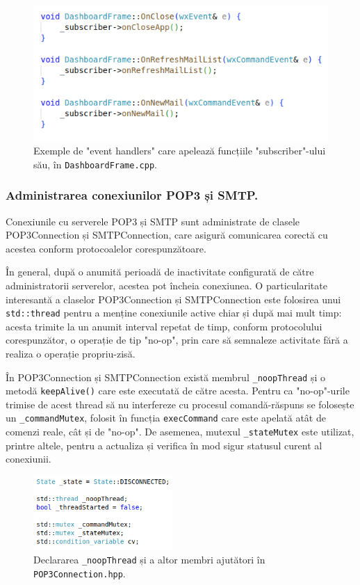 \documentclass[runningheads]{llncs}
\begin{document}
\begin{figure}
    \centering
    \includegraphics[width=\textwidth]{subscriberFxns.png}
    \caption{Exemple de "event handlers" care apelează funcțiile "subscriber"-ului său, în \texttt{DashboardFrame.cpp}.}
    \label{fig:subscriberFxns}
\end{figure}

\subsubsection{Administrarea conexiunilor POP3 și SMTP.}

Conexiunile cu serverele POP3 și SMTP sunt administrate de clasele POP3Connection și SMTPConnection, care asigură comunicarea corectă cu acestea conform protocoalelor corespunzătoare. 

În general, după o anumită perioadă de inactivitate configurată de către administratorii serverelor, acestea pot încheia conexiunea. O particularitate interesantă a claselor POP3Connection și SMTPConnection este folosirea unui \texttt{std::thread} pentru a menține conexiunile active chiar și după mai mult timp: acesta trimite la un anumit interval repetat de timp, conform protocolului corespunzător, o operație de tip "no-op", prin care să semnaleze activitate fără a realiza o operație propriu-zisă.

În POP3Connection și SMTPConnection există membrul \texttt{\_noopThread} și o metodă \texttt{keepAlive()} care este executată de către acesta. Pentru ca "no-op"-urile trimise de acest thread să nu interfereze cu procesul comandă-răspuns se folosește un \texttt{\_commandMutex}, folosit în funcția \texttt{execCommand} care este apelată atât de comenzi reale, cât și de "no-op". De asemenea, mutexul \texttt{\_stateMutex} este utilizat, printre altele, pentru a actualiza și verifica în mod sigur statusul curent al conexiunii.

\begin{figure}
    \centering
    \includegraphics[width={200px}]{noopThread.png}
    \caption{Declararea \texttt{\_noopThread} și a altor membri ajutători în \texttt{POP3Connection.hpp}.}
    \label{fig:noopThread}
\end{figure}
\end{document}
